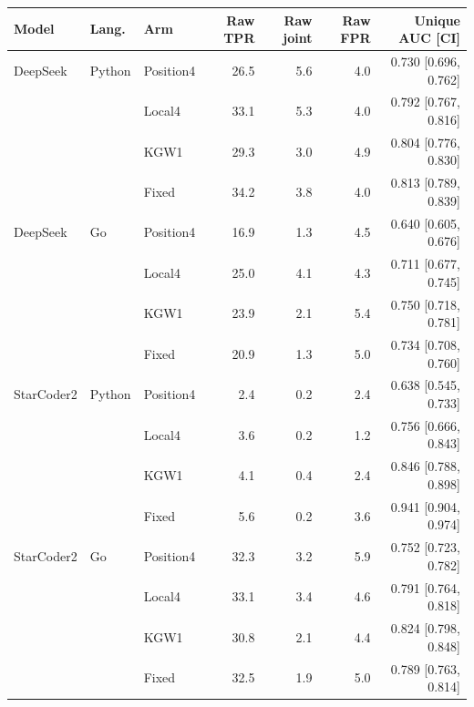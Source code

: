 \begin{tabular}{lllrrrr}
\toprule
Model & Lang. & Arm & Raw TPR & Raw joint & Raw FPR & Unique AUC [CI] \\
\midrule
DeepSeek & Python & Position4 & 26.5 & 5.6 & 4.0 & 0.730 [0.696, 0.762] \\
 &  & Local4 & 33.1 & 5.3 & 4.0 & 0.792 [0.767, 0.816] \\
 &  & KGW1 & 29.3 & 3.0 & 4.9 & 0.804 [0.776, 0.830] \\
 &  & Fixed & 34.2 & 3.8 & 4.0 & 0.813 [0.789, 0.839] \\
DeepSeek & Go & Position4 & 16.9 & 1.3 & 4.5 & 0.640 [0.605, 0.676] \\
 &  & Local4 & 25.0 & 4.1 & 4.3 & 0.711 [0.677, 0.745] \\
 &  & KGW1 & 23.9 & 2.1 & 5.4 & 0.750 [0.718, 0.781] \\
 &  & Fixed & 20.9 & 1.3 & 5.0 & 0.734 [0.708, 0.760] \\
StarCoder2 & Python & Position4 & 2.4 & 0.2 & 2.4 & 0.638 [0.545, 0.733] \\
 &  & Local4 & 3.6 & 0.2 & 1.2 & 0.756 [0.666, 0.843] \\
 &  & KGW1 & 4.1 & 0.4 & 2.4 & 0.846 [0.788, 0.898] \\
 &  & Fixed & 5.6 & 0.2 & 3.6 & 0.941 [0.904, 0.974] \\
StarCoder2 & Go & Position4 & 32.3 & 3.2 & 5.9 & 0.752 [0.723, 0.782] \\
 &  & Local4 & 33.1 & 3.4 & 4.6 & 0.791 [0.764, 0.818] \\
 &  & KGW1 & 30.8 & 2.1 & 4.4 & 0.824 [0.798, 0.848] \\
 &  & Fixed & 32.5 & 1.9 & 5.0 & 0.789 [0.763, 0.814] \\
\bottomrule
\end{tabular}
